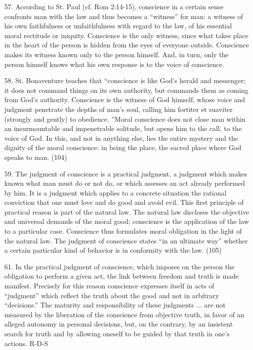 \documentclass[oneside]{book}
\begin{document}
57. According to St. Paul (cf. Rom 2:14-15), conscience in a certain sense
confronts man with the law and thus becomes a ``witness'' for man: a witness of
his own faithfulness or unfaithfulness with regard to the law, of his essential
moral rectitude or iniquity. Conscience is the only witness, since what takes
place in the heart of the person is hidden from the eyes of everyone
outside. Conscience makes its witness known only to the person himself. And, in
turn, only the person himself knows what his own response is to the voice of
conscience.

58. St. Bonaventure teaches that ``conscience is like God's herald and
messenger; it does not command things on its own authority, but commands them as
coming from God's authority. Conscience is the witness of God himself, whose
voice and judgment penetrate the depths of man's soul, calling him fortiter et
suaviter (strongly and gently) to obedience. ''Moral conscience does not close
man within an insurmountable and impenetrable solitude, but opens him to the
call, to the voice of God. In this, and not in anything else, lies the entire
mystery and the dignity of the moral conscience: in being the place, the sacred
place where God speaks to man. (104)

59. The judgment of conscience is a practical judgment, a judgment which makes
known what man must do or not do, or which assesses an act already performed by
him. It is a judgment which applies to a concrete situation the rational
conviction that one must love and do good and avoid evil. This first principle
of practical reason is part of the natural law. The natural law discloses the
objective and universal demands of the moral good; conscience is the application
of the law to a particular case. Conscience thus formulates moral obligation in
the light of the natural law. The judgment of conscience states ``in an ultimate
way'' whether a certain particular kind of behavior is in conformity with the
law. (105)

61. In the practical judgment of conscience, which imposes on the person the
obligation to perform a given act, the link between freedom and truth is made
manifest. Precisely for this reason conscience expresses itself in acts of
``judgment'' which reflect the truth about the good and not in arbitrary
``decisions.'' The maturity and responsibility of these judgments ... are not
measured by the liberation of the conscience from objective truth, in favor of
an alleged autonomy in personal decisions, but, on the contrary, by an insistent
search for truth and by allowing oneself to be guided by that truth in one's
actions.
R-D-S
\end{document}
